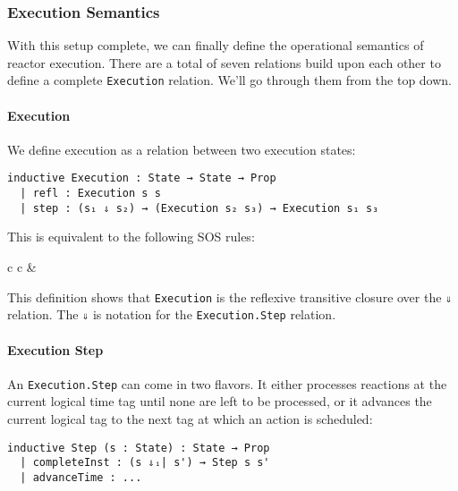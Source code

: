 \subsubsection{Execution Semantics}

With this setup complete, we can finally define the operational semantics of reactor execution.
There are a total of seven relations build upon each other to define a complete \lstinline{Execution} relation.
We'll go through them from the top down.

\paragraph{Execution}

We define execution as a relation between two execution states:

\begin{lstlisting}
inductive Execution : State → State → Prop
  | refl : Execution s s
  | step : (s₁ ⇓ s₂) → (Execution s₂ s₃) → Execution s₁ s₃
\end{lstlisting}

This is equivalent to the following SOS rules:

\vspace*{3mm}

\begin{tabular}{c c}
 & 
\end{tabular}

\vspace*{3mm}

This definition shows that \lstinline{Execution} is the reflexive transitive closure over the \lstinline{⇓} relation.
The \lstinline{⇓} is notation for the \lstinline{Execution.Step} relation.

\paragraph{Execution Step}

An \lstinline{Execution.Step} can come in two flavors.
It either processes reactions at the current logical time tag until none are left to be processed, or it advances the current logical tag to the next tag at which an action is scheduled:

\begin{lstlisting}
inductive Step (s : State) : State → Prop 
  | completeInst : (s ⇓ᵢ| s') → Step s s'
  | advanceTime : ...
\end{lstlisting}

